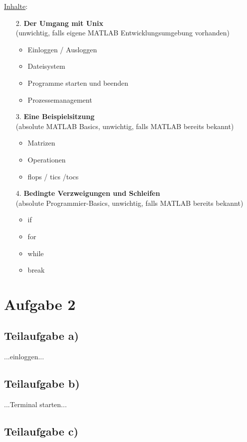 \documentclass{llncs}
\begin{document}
\underline{Inhalte}:
\begin{itemize}
\item[2.] \textbf{Der Umgang mit Unix}\\(unwichtig, falls eigene MATLAB Entwicklungsumgebung vorhanden)
\begin{itemize}
\item Einloggen / Ausloggen
\item Dateisystem
\item Programme starten und beenden
\item Prozessemanagement
\end{itemize}
\item[3.] \textbf{Eine Beispielsitzung}\\(absolute MATLAB Basics, unwichtig, falls MATLAB bereits bekannt)
\begin{itemize}
\item Matrizen
\item Operationen
\item flops / tics /tocs
\end{itemize}
\item[4.] \textbf{Bedingte Verzweigungen und Schleifen}\\(absolute Programmier-Basics, unwichtig, falls MATLAB bereits bekannt)
\begin{itemize}
\item if
\item for
\item while
\item break
\end{itemize}
\end{itemize}
\newpage

\section*{Aufgabe 2}

\subsection*{Teilaufgabe a)}

...einloggen...

\subsection*{Teilaufgabe b)}

...Terminal starten...

\subsection*{Teilaufgabe c)}
\end{document}
